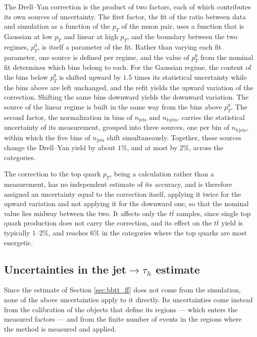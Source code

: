 The Drell--Yan correction is the product of two factors, each of which contributes its own sources of uncertainty. The first factor, the fit of the ratio between data and simulation as a function of the $p_T$ of the muon pair, uses a function that is Gaussian at low $p_T$ and linear at high $p_T$, and the boundary between the two regimes, $p_T^0$, is itself a parameter of the fit. Rather than varying each fit parameter, one source is defined per regime, and the value of $p_T^0$ from the nominal fit determines which bins belong to each. For the Gaussian regime, the content of the bins below $p_T^0$ is shifted upward by $1.5$ times its statistical uncertainty while the bins above are left unchanged, and the refit yields the upward variation of the correction. Shifting the same bins downward yields the downward variation. The source of the linear regime is built in the same way from the bins above $p_T^0$. The second factor, the normalization in bins of $n_\text{jets}$ and $n_{b\,\text{jets}}$, carries the statistical uncertainty of its measurement, grouped into three sources, one per bin of $n_{b\,\text{jets}}$, within which the five bins of $n_\text{jets}$ shift simultaneously. Together, these sources change the Drell--Yan yield by about $1\%$, and at most by $2\%$, across the categories.

The correction to the top quark $p_T$, being a calculation rather than a measurement, has no independent estimate of its accuracy, and is therefore assigned an uncertainty equal to the correction itself, applying it twice for the upward variation and not applying it for the downward one, so that the nominal value lies midway between the two. It affects only the $t\bar{t}$ samples, since single top quark production does not carry the correction, and its effect on the $t\bar{t}$ yield is typically $1$--$2\%$, and reaches $6\%$ in the categories where the top quarks are most energetic.

\subsection{Uncertainties in the jet\texorpdfstring{$\to\tau_h$}{ -> tau h} estimate}
%
Since the estimate of Section \ref{sec:bbtt_ff} does not come from the simulation, none of the above uncertainties apply to it directly. Its uncertainties come instead from the calibration of the objects that define its regions — which enters the measured factors — and from the finite number of events in the regions where the method is measured and applied.

